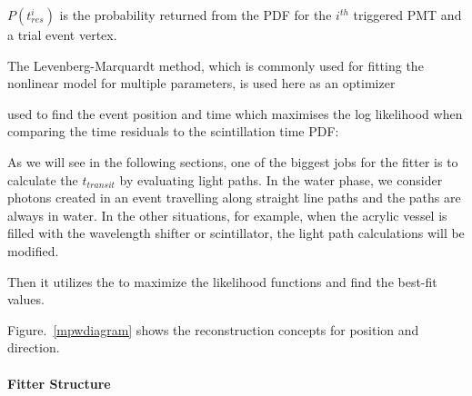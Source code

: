 $P(t^i_{res})$ is the probability returned from the PDF for the $i^{th}$ triggered PMT and a trial event
vertex.

The Levenberg-Marquardt method, which is commonly used for fitting the nonlinear model for multiple parameters, is used here as an optimizer 


used to find the event position and time which maximises the log likelihood when
comparing the time residuals to the scintillation time PDF:




As we will see in the following sections, one of the biggest jobs for the fitter is to calculate the $t_{transit}$ by evaluating light paths. In the water phase, we consider photons created in an event travelling along straight line paths and the paths are always in water. In the other situations, for example, when the acrylic vessel is filled with the wavelength shifter or scintillator, the light path calculations will be modified.   





Then it utilizes the   to maximize the likelihood functions and find the best-fit values.



Figure.~\ref{mpwdiagram} shows the reconstruction concepts for position and direction.



\paragraph{Fitter Structure}

